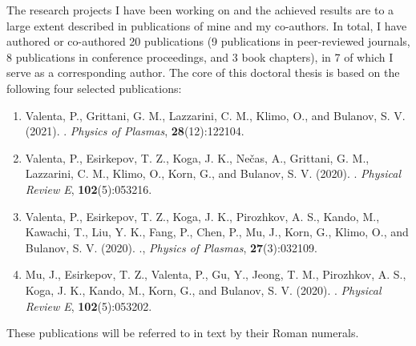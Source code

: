 \documentclass[10pt, a4paper, twoside, openright]{report}
\newcommand{\link}[3][blue]{\href{#2}{\color{#1}{#3}}}%
\begin{document}

The research projects I have been working on and the achieved results are to a large extent described in publications of mine and my co-authors. In total, I have authored or co-authored 20 publications (9 publications in peer-reviewed journals, 8 publications in conference proceedings, and 3 book chapters), in 7 of which I serve as a corresponding author. The core of this doctoral thesis is based on the following four selected publications:
\begin{enumerate}[label=\Roman*.]
	\item \label{paper_1} Valenta, P., Grittani, G. M., Lazzarini, C. M., Klimo, O., and Bulanov, S. V. (2021). \link{http://dx.doi.org/10.1063/5.0065167}{On the electromagnetic-electron rings originating from the interaction of high-power short-pulse laser and underdense plasma}. \textit{Physics of Plasmas}, \textbf{28}(12):122104.
	
	\item \label{paper_2} Valenta, P., Esirkepov, T. Z., Koga, J. K., Nečas, A., Grittani, G. M., Lazzarini, C. M., Klimo, O., Korn, G., and Bulanov, S. V. (2020). \link{http://dx.doi.org/10.1103/PhysRevE.102.053216}{Polarity reversal of wakefields driven by ultrashort pulse laser}. \textit{Physical Review E}, \textbf{102}(5):053216.
	
	\item \label{paper_3} Valenta, P., Esirkepov, T. Z., Koga, J. K., Pirozhkov, A. S., Kando, M., Kawachi, T., Liu, Y. K., Fang, P., Chen, P., Mu, J., Korn, G., Klimo, O., and Bulanov, S. V. (2020). \link{http://dx.doi.org/10.1063/1.5142084}{Recoil effects on reflection from relativistic mirrors in laser plasmas}., \textit{Physics of Plasmas}, \textbf{27}(3):032109.
	
	\item \label{paper_4} Mu, J., Esirkepov, T. Z., Valenta, P., Gu, Y., Jeong, T. M., Pirozhkov, A. S., Koga, J. K., Kando, M., Korn, G., and Bulanov, S. V. (2020). \link{http://dx.doi.org/10.1103/PhysRevE.102.053202}{Relativistic flying forcibly oscillating reflective diffraction grating}. \textit{Physical Review E}, \textbf{102}(5):053202.
	
\end{enumerate}
These publications will be referred to in text by their Roman numerals.
\end{document}
